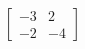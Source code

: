 \documentclass[preview]{standalone}
\begin{document}
\begin{center}
$\begin{bmatrix}-3 & 2 \\ -2 & -4\end{bmatrix}$
\end{center}
\end{document}

